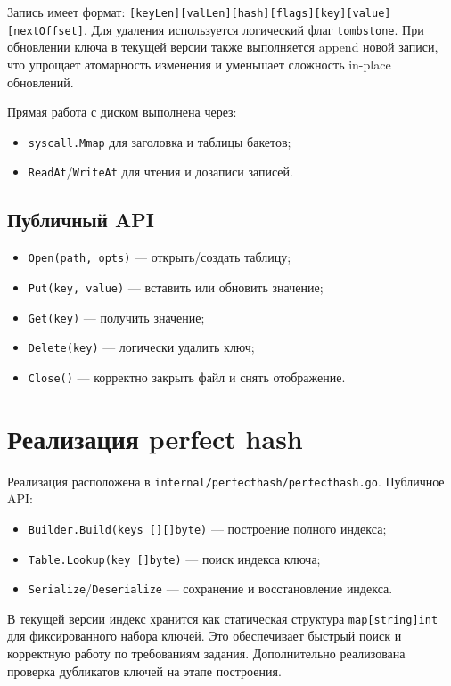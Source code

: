 \documentclass{itmo}
\begin{document}
Запись имеет формат:
\texttt{[keyLen][valLen][hash][flags][key][value][nextOffset]}.
Для удаления используется логический флаг \texttt{tombstone}.
При обновлении ключа в текущей версии также выполняется append новой записи,
что упрощает атомарность изменения и уменьшает сложность in-place обновлений.

Прямая работа с диском выполнена через:
\begin{itemize}
	\item \texttt{syscall.Mmap} для заголовка и таблицы бакетов;
	\item \texttt{ReadAt}/\texttt{WriteAt} для чтения и дозаписи записей.
\end{itemize}

\subsection*{Публичный API}
\begin{itemize}
	\item \texttt{Open(path, opts)} --- открыть/создать таблицу;
	\item \texttt{Put(key, value)} --- вставить или обновить значение;
	\item \texttt{Get(key)} --- получить значение;
	\item \texttt{Delete(key)} --- логически удалить ключ;
	\item \texttt{Close()} --- корректно закрыть файл и снять отображение.
\end{itemize}

\section{Реализация perfect hash}

Реализация расположена в \texttt{internal/perfecthash/perfecthash.go}.
Публичное API:
\begin{itemize}
	\item \texttt{Builder.Build(keys [][]byte)} --- построение полного индекса;
	\item \texttt{Table.Lookup(key []byte)} --- поиск индекса ключа;
	\item \texttt{Serialize}/\texttt{Deserialize} --- сохранение и восстановление индекса.
\end{itemize}

В текущей версии индекс хранится как статическая структура \texttt{map[string]int}
для фиксированного набора ключей.
Это обеспечивает быстрый поиск и корректную работу по требованиям задания.
Дополнительно реализована проверка дубликатов ключей на этапе построения.
\end{document}
